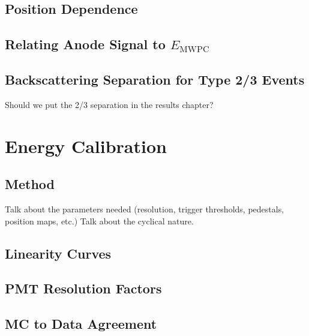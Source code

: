 \subsection{Position Dependence}

\subsection{Relating Anode Signal to $E_{\mathrm{MWPC}}$}

\subsection{Backscattering Separation for Type 2/3 Events}
Should we put the 2/3 separation in the results chapter?


\section{Energy Calibration}

\subsection{Method}
Talk about the parameters needed (resolution, trigger thresholds, pedestals, position maps, etc.)
Talk about the cyclical nature.
\subsection{Linearity Curves}
\subsection{PMT Resolution Factors} \label{ssec:PMTresolution}
\subsection{MC to Data Agreement}








